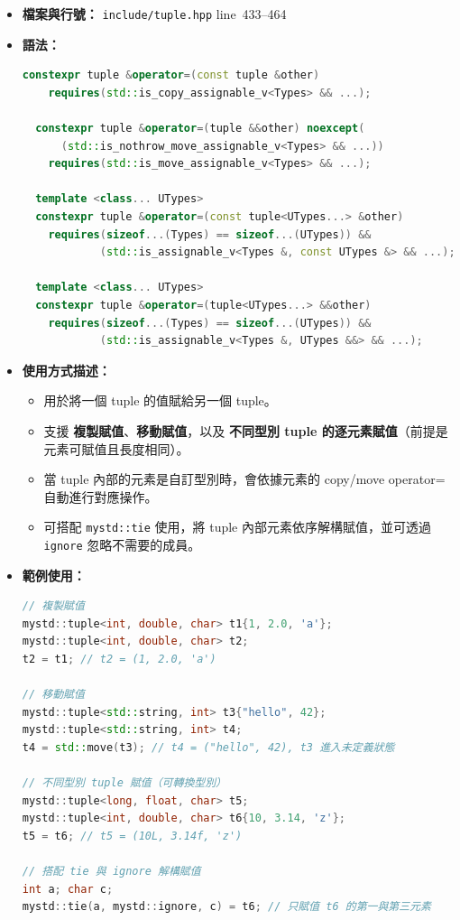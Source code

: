\documentclass[a4paper,12pt]{article}
\begin{document}
\begin{itemize}
\item \textbf{檔案與行號：} \verb|include/tuple.hpp| line~433--464
\item \textbf{語法：}
\begin{lstlisting}[language=C++]
  constexpr tuple &operator=(const tuple &other)
    requires(std::is_copy_assignable_v<Types> && ...);

  constexpr tuple &operator=(tuple &&other) noexcept(
      (std::is_nothrow_move_assignable_v<Types> && ...))
    requires(std::is_move_assignable_v<Types> && ...);

  template <class... UTypes>
  constexpr tuple &operator=(const tuple<UTypes...> &other)
    requires(sizeof...(Types) == sizeof...(UTypes)) &&
            (std::is_assignable_v<Types &, const UTypes &> && ...);

  template <class... UTypes>
  constexpr tuple &operator=(tuple<UTypes...> &&other)
    requires(sizeof...(Types) == sizeof...(UTypes)) &&
            (std::is_assignable_v<Types &, UTypes &&> && ...);
\end{lstlisting}
\item \textbf{使用方式描述：}
\begin{itemize}
  \item 用於將一個 tuple 的值賦給另一個 tuple。
  \item 支援 \textbf{複製賦值}、\textbf{移動賦值}，以及 \textbf{不同型別 tuple 的逐元素賦值}（前提是元素可賦值且長度相同）。
  \item 當 tuple 內部的元素是自訂型別時，會依據元素的 copy/move operator= 自動進行對應操作。
  \item 可搭配 \verb|mystd::tie| 使用，將 tuple 內部元素依序解構賦值，並可透過 \verb|ignore| 忽略不需要的成員。
\end{itemize}
\item \textbf{範例使用：}
\begin{lstlisting}[language=C++]
// 複製賦值
mystd::tuple<int, double, char> t1{1, 2.0, 'a'};
mystd::tuple<int, double, char> t2;
t2 = t1; // t2 = (1, 2.0, 'a')

// 移動賦值
mystd::tuple<std::string, int> t3{"hello", 42};
mystd::tuple<std::string, int> t4;
t4 = std::move(t3); // t4 = ("hello", 42), t3 進入未定義狀態

// 不同型別 tuple 賦值（可轉換型別）
mystd::tuple<long, float, char> t5;
mystd::tuple<int, double, char> t6{10, 3.14, 'z'};
t5 = t6; // t5 = (10L, 3.14f, 'z')

// 搭配 tie 與 ignore 解構賦值
int a; char c;
mystd::tie(a, mystd::ignore, c) = t6; // 只賦值 t6 的第一與第三元素
\end{lstlisting}
\end{itemize}
\end{document}
